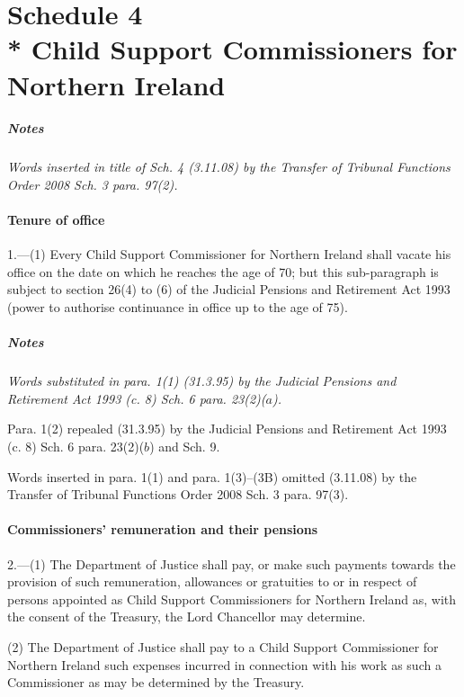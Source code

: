 \documentclass[a4paper]{article}
\newcommand{\parthead}{}
\newcommand\amendment[1]{\subsubsection*{Notes}{\itshape\frenchspacing\footnotesize #1 \par}}
\begin{document}
\part[Schedule 4 --- Child Support Commissioners for Northern Ireland]{Schedule 4\\* Child Support Commissioners for Northern Ireland}

\renewcommand\parthead{--- Schedule 4}

\amendment{
Words inserted in title of Sch. 4 (3.11.08) by the Transfer of Tribunal Functions Order 2008  Sch. 3 para. 97(2).
}

\subsection*{Tenure of office}

1.—(1) Every Child Support Commissioner for Northern Ireland shall vacate his office on the date on which he reaches the age of 70; but this sub-paragraph is subject to section 26(4) to (6) of the Judicial Pensions and Retirement Act 1993 (power to authorise continuance in office up to the age of 75).

\amendment{
Words substituted in para. 1(1) (31.3.95) by the Judicial Pensions and Retirement Act 1993 (c. 8) Sch. 6 para. 23(2)($a$).

Para. 1(2) repealed (31.3.95) by the Judicial Pensions and Retirement Act 1993 (c. 8) Sch. 6 para. 23(2)($b$) and Sch. 9.

Words inserted in para. 1(1) and para. 1(3)--(3B) omitted (3.11.08) by the Transfer of Tribunal Functions Order 2008  Sch. 3 para. 97(3).

}

\subsection*{Commissioners' remuneration and their pensions}

2.—(1) The Department of Justice shall pay, or make such payments towards the provision of such remuneration, allowances or gratuities to or in respect of persons appointed as Child Support Commissioners for Northern Ireland as, with the consent of the Treasury, the Lord Chancellor may determine.

(2) The Department of Justice shall pay to a Child Support Commissioner for Northern Ireland such expenses incurred in connection with his work as such a Commissioner as may be determined by the Treasury.
\end{document}
